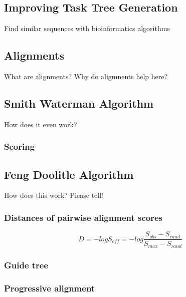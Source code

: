 \subsection{Improving Task Tree Generation}
Find similar sequences with bioinformatics algorithms

\subsection{Alignments}
What are alignments? Why do aligmnents help here?

\subsection{Smith Waterman Algorithm}
How does it even work?

\subsubsection{Scoring}

\subsection{Feng Doolitle Algorithm}
How does this work? Please tell!

\subsubsection{Distances of pairwise alignment scores}

\begin{equation}
	D = -log S_{eff} = -log \frac{S_{obs} - S_{rand}}{S_{max} - S_{rand}}
\end{equation}

\subsubsection{Guide tree}

\subsubsection{Progressive alignment}

